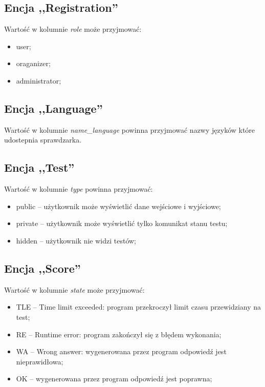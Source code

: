 \documentclass[a4paper]{mwart}
\begin{document}
\subsection{Encja ,,Registration''}
Wartość w kolumnie \textit{role} może przyjmować:
\begin{itemize}
	\item user;
	\item oraganizer;
	\item administrator;
\end{itemize}

\subsection{Encja ,,Language''}
Wartość w kolumnie \textit{name\_language} powinna przyjmować nazwy języków które udostepnia sprawdzarka.

\subsection{Encja ,,Test''}
Wartość w kolumnie \textit{type} powinna przyjmować:
\begin{itemize}
	\item public -- użytkownik może wyświetlić dane wejściowe i wyjściowe;
	\item private -- użytkownik może wyświetlić tylko komunikat stanu testu;
	\item hidden -- użytkownik nie widzi testów;
\end{itemize}

\subsection{Encja ,,Score''}
Wartość w kolumnie \textit{state} może przyjmować:
\begin{itemize}
	\item TLE -- Time limit exceeded: program przekroczył limit czasu przewidziany na test;
	\item RE -- Runtime error: program zakończył się z błędem wykonania;
	\item WA -- Wrong answer: wygenerowana przez program odpowiedź jest nieprawidłowa;
	\item OK -- wygenerowana przez program odpowiedź jest poprawna;
\end{itemize}
	
\end{document}
